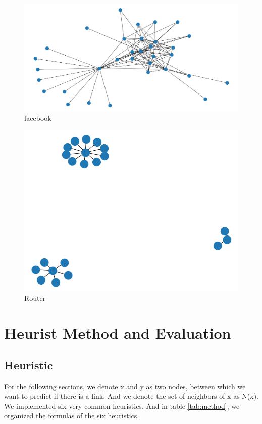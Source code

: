\documentclass[12pt]{article}
\begin{document}
\begin{figure}[h]
	\centering
	\includegraphics[scale=0.3]{Facebook}
	\caption{facebook}
	\label{fig:facebook}
\end{figure}

\begin{figure}[h]
	\centering
	\includegraphics[scale=0.3]{Router}
	\caption{Router}
	\label{fig:Router}
\end{figure}
\section{Heurist Method and Evaluation}

\subsection{Heuristic}
For the following sections, we denote x and y as two nodes, between which we want to predict if there is a link. And we denote the set of neighbors of x as N(x). We implemented six very common heuristics. And in table \ref{tab:method}, we organized the formulas of the six heuristics. \\
\end{document}
